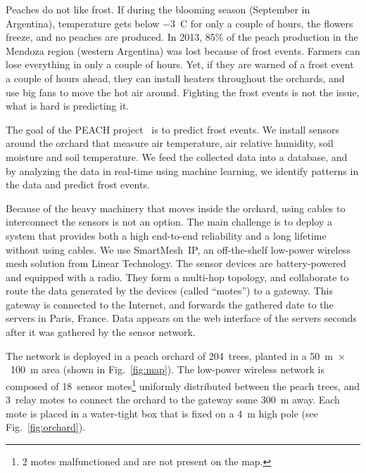 \documentclass{elsarticle}
\newcommand{\smip}                {SmartMesh~IP\xspace}
\begin{document}

Peaches do not like frost.
If during the blooming season (September in Argentina), temperature gets below $-$3~C for only a couple of hours, the flowers freeze, and no peaches are produced.
In 2013, 85\% of the peach production in the Mendoza region (western Argentina) was lost because of frost events.
Farmers can lose everything in only a couple of hours.
Yet, if they are warned of a frost event a couple of hours ahead, they can install heaters throughout the orchards, and use big fans to move the hot air around.
Fighting the frost events is not the issue, what is hard is predicting it.


The goal of the PEACH project~\cite{watteyne16peach} is to predict frost events.
We install sensors around the orchard that measure air temperature, air relative humidity, soil moisture and soil temperature.
We feed the collected data into a database, and by analyzing the data in real-time using machine learning, we identify patterns in the data and predict frost events.


Because of the heavy machinery that moves inside the orchard, using cables to interconnect the sensors is not an option.
The main challenge is to deploy a system that provides both a high end-to-end reliability and a long lifetime without using cables.
We use \smip, an off-the-shelf low-power wireless mesh solution from Linear Technology.
The sensor devices are battery-powered and equipped with a radio.
They form a multi-hop topology, and collaborate to route the data generated by the devices (called ``motes'') to a gateway.
This gateway is connected to the Internet, and forwards the gathered date to the servers in Paris, France.
Data appears on the web interface of the servers seconds after it was gathered by the sensor network.


The network is deployed in a peach orchard of 204~trees, planted in a 50~m~$\times$~100~m area (shown in Fig.~\ref{fig:map}).
The low-power wireless network is composed of 18~sensor motes\footnote{2 motes malfunctioned and are not present on the map.} uniformly distributed between the peach trees, and 3~relay motes to connect the orchard to the gateway some 300~m away.
Each mote is placed in a water-tight box that is fixed on a 4~m high pole (see Fig.~\ref{fig:orchard}).
\end{document}
